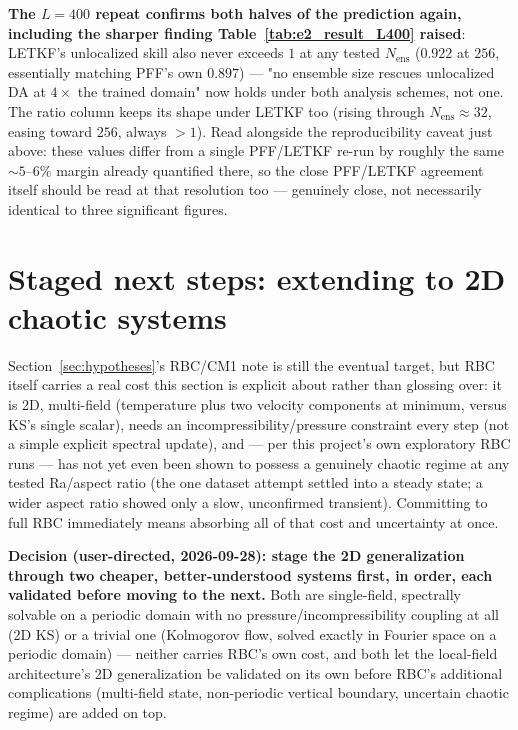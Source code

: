 \documentclass[11pt]{article}
\begin{document}
\textbf{The $L=400$ repeat confirms both halves of the prediction
again, including the sharper finding Table~\ref{tab:e2_result_L400}
raised}: LETKF's unlocalized skill also never exceeds $1$ at any
tested $N_{\mathrm{ens}}$ ($0.922$ at $256$, essentially matching
PFF's own $0.897$) --- "no ensemble size rescues unlocalized DA at
$4\times$ the trained domain" now holds under both analysis schemes,
not one. The ratio column keeps its shape under LETKF too (rising
through $N_{\mathrm{ens}}\approx32$, easing toward $256$, always
$>1$). Read alongside the reproducibility caveat just above: these
values differ from a single PFF/LETKF re-run by roughly the same
$\sim5$--$6\%$ margin already quantified there, so the close PFF/LETKF
agreement itself should be read at that resolution too --- genuinely
close, not necessarily identical to three significant figures.

\section{Staged next steps: extending to 2D chaotic systems}
\label{sec:next_steps}

Section~\ref{sec:hypotheses}'s RBC/CM1 note is still the eventual
target, but RBC itself carries a real cost this section is explicit
about rather than glossing over: it is 2D, multi-field (temperature
plus two velocity components at minimum, versus KS's single scalar),
needs an incompressibility/pressure constraint every step (not a
simple explicit spectral update), and --- per this project's own
exploratory RBC runs --- has not yet even been shown to possess a
genuinely chaotic regime at any tested Ra/aspect ratio (the one
dataset attempt settled into a steady state; a wider aspect ratio
showed only a slow, unconfirmed transient). Committing to full RBC
immediately means absorbing all of that cost and uncertainty at once.

\textbf{Decision (user-directed, 2026-09-28): stage the 2D generalization
through two cheaper, better-understood systems first, in order, each
validated before moving to the next.} Both are single-field, spectrally
solvable on a periodic domain with no pressure/incompressibility
coupling at all (2D KS) or a trivial one (Kolmogorov flow, solved
exactly in Fourier space on a periodic domain) --- neither carries
RBC's own cost, and both let the local-field architecture's 2D
generalization be validated on its own before RBC's additional
complications (multi-field state, non-periodic vertical boundary,
uncertain chaotic regime) are added on top.
\end{document}
